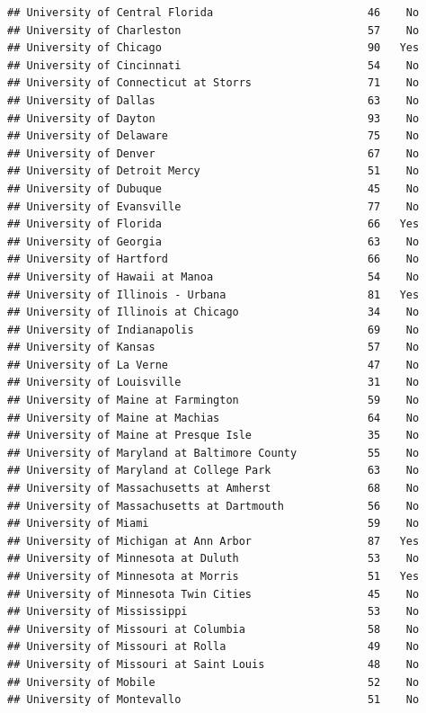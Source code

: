 \documentclass[
]{article}
\begin{document}
\begin{verbatim}
## University of Central Florida                        46    No
## University of Charleston                             57    No
## University of Chicago                                90   Yes
## University of Cincinnati                             54    No
## University of Connecticut at Storrs                  71    No
## University of Dallas                                 63    No
## University of Dayton                                 93    No
## University of Delaware                               75    No
## University of Denver                                 67    No
## University of Detroit Mercy                          51    No
## University of Dubuque                                45    No
## University of Evansville                             77    No
## University of Florida                                66   Yes
## University of Georgia                                63    No
## University of Hartford                               66    No
## University of Hawaii at Manoa                        54    No
## University of Illinois - Urbana                      81   Yes
## University of Illinois at Chicago                    34    No
## University of Indianapolis                           69    No
## University of Kansas                                 57    No
## University of La Verne                               47    No
## University of Louisville                             31    No
## University of Maine at Farmington                    59    No
## University of Maine at Machias                       64    No
## University of Maine at Presque Isle                  35    No
## University of Maryland at Baltimore County           55    No
## University of Maryland at College Park               63    No
## University of Massachusetts at Amherst               68    No
## University of Massachusetts at Dartmouth             56    No
## University of Miami                                  59    No
## University of Michigan at Ann Arbor                  87   Yes
## University of Minnesota at Duluth                    53    No
## University of Minnesota at Morris                    51   Yes
## University of Minnesota Twin Cities                  45    No
## University of Mississippi                            53    No
## University of Missouri at Columbia                   58    No
## University of Missouri at Rolla                      49    No
## University of Missouri at Saint Louis                48    No
## University of Mobile                                 52    No
## University of Montevallo                             51    No

\end{verbatim}
\end{document}

